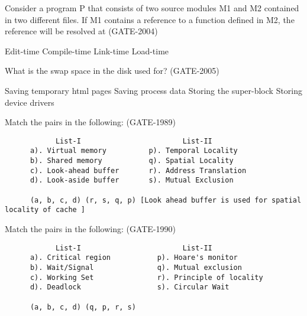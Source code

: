 \begin{questyle}

  \question  Consider a program P that consists of two source modules M1 and M2 contained in two different files. If M1 contains a reference to a function defined in M2, the reference will be resolved at (GATE-2004)

  \begin{oneparchoices}
    \choice Edit-time
    \choice Compile-time
    \correctchoice Link-time
    \choice Load-time
  \end{oneparchoices}

\end{questyle}


\begin{questyle}

  \question  What is the swap space in the disk used for? (GATE-2005)

  \begin{choices}
    \choice Saving temporary html pages
    \correctchoice Saving process data
    \choice Storing the super-block
    \choice Storing device drivers
  \end{choices}

\end{questyle}


\begin{questyle}

  \question Match the pairs in the following: (GATE-1989)
  \begin{lstlisting}
            List-I                        List-II
      a). Virtual memory          p). Temporal Locality
      b). Shared memory           q). Spatial Locality
      c). Look-ahead buffer       r). Address Translation
      d). Look-aside buffer       s). Mutual Exclusion

      (a, b, c, d) (r, s, q, p) [Look ahead buffer is used for spatial locality of cache ]
  \end{lstlisting}
\end{questyle}


\begin{questyle}

  \question Match the pairs in the following: (GATE-1990)

  \begin{lstlisting}
            List-I                        List-II
      a). Critical region           p). Hoare's monitor
      b). Wait/Signal               q). Mutual exclusion
      c). Working Set               r). Principle of locality
      d). Deadlock                  s). Circular Wait

      (a, b, c, d) (q, p, r, s)
  \end{lstlisting}
\end{questyle}

